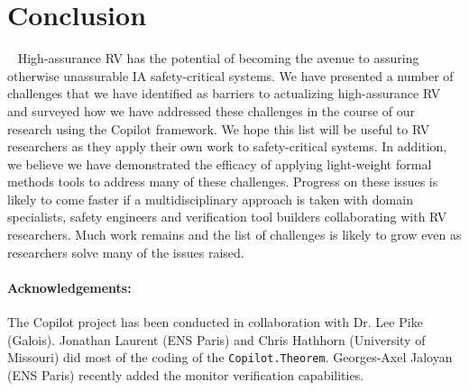 \section{Conclusion}~\label{sec:conclusion} High-assurance RV has
the potential of becoming the avenue to assuring
otherwise unassurable IA safety-critical systems. We have presented a
number of challenges that we have identified as barriers to
actualizing high-assurance RV and surveyed how we have addressed these
challenges in the course of our research using the Copilot
framework. We hope this list will be useful to RV researchers as they
apply their own work to safety-critical systems.  In addition, we
believe we have demonstrated the efficacy of applying light-weight
formal methods tools to address many of these challenges.  Progress on
these issues is likely to come faster if a multidisciplinary approach
is taken with domain specialists, safety engineers and verification tool
builders collaborating with RV researchers. Much work
remains and the list of challenges is likely to grow even as researchers
solve  many of the issues raised.

\paragraph{Acknowledgements:} The Copilot project  has
been conducted in collaboration with Dr. Lee Pike (Galois).  Jonathan
Laurent (ENS Paris)  and Chris Hathhorn (University of Missouri) did
most of the coding of the {\tt Copilot.Theorem}.   Georges-Axel
Jaloyan (ENS Paris)  recently added the  monitor verification capabilities. 